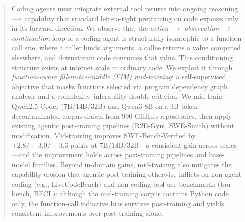 \vspace{-2.5ex}

\begin{abstract}
Coding agents must integrate external tool returns into ongoing reasoning---a
capability that standard left-to-right pretraining on code exposes only in its
forward direction. We observe that the
\textit{action $\rightarrow$ observation $\rightarrow$ continuation} loop of a
coding agent is structurally isomorphic to a function call site, where a
caller binds arguments, a callee returns a value computed elsewhere, and
downstream code consumes that value. This conditioning structure exists at
internet scale in ordinary code. We exploit it through
\emph{function-aware fill-in-the-middle (FIM) mid-training}: a self-supervised
objective that masks functions selected via program dependency graph
analysis and a complexity--inferability double criterion. We mid-train
Qwen2.5-Coder (7B/14B/32B) and Qwen3-8B on a 3B-token decontaminated corpus
drawn from 990 GitHub repositories, then apply existing agentic post-training
pipelines (R2E-Gym, SWE-Smith) without modification. Mid-training improves
SWE-Bench-Verified by $+2.8/+3.0/+3.3$ points at 7B/14B/32B---a consistent
gain across scales---and the improvement holds across post-training pipelines
and base-model families. Beyond in-domain gains, mid-training also mitigates
the capability erosion that agentic post-training otherwise inflicts on
non-agent coding (e.g., LiveCodeBench) and non-coding tool-use benchmarks
(tau-bench, BFCL): although the mid-training corpus contains Python code
only, the function-call inductive bias survives post-training and yields
consistent improvements over post-training alone.
\end{abstract}

\vspace{-1.5ex}